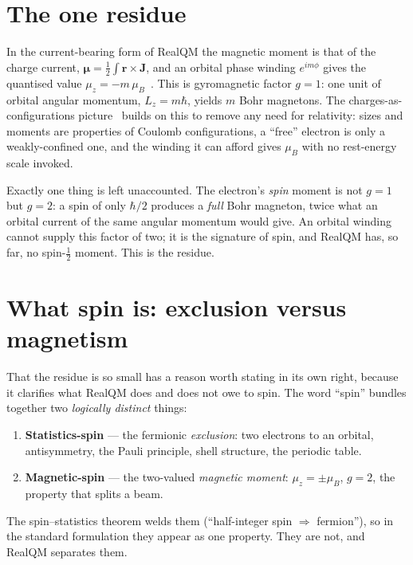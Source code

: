 \documentclass[11pt]{article}
\begin{document}

\section{The one residue}
\label{sec:residue}

In the current-bearing form of RealQM the magnetic moment is that of the charge current,
$\boldsymbol\mu=\tfrac12\int\mathbf r\times\mathbf J$, and an orbital phase winding $e^{im\phi}$ gives the
quantised value $\mu_z=-m\,\mu_B$~\cite{ComplexRealQM,NuclearMoment}. This is gyromagnetic factor
$g=1$: one unit of orbital angular momentum, $L_z=m\hbar$, yields $m$ Bohr magnetons. The
charges-as-configurations picture~\cite{Charges} builds on this to remove any need for relativity: sizes
and moments are properties of Coulomb configurations, a ``free'' electron is only a weakly-confined one,
and the winding it can afford gives $\mu_B$ with no rest-energy scale invoked.

Exactly one thing is left unaccounted. The electron's \emph{spin} moment is not $g=1$ but
\textbf{$g=2$}: a spin of only $\hbar/2$ produces a \emph{full} Bohr magneton, twice what an orbital
current of the same angular momentum would give. An orbital winding cannot supply this factor of two; it
is the signature of spin, and RealQM has, so far, no spin-$\tfrac12$ moment. This is the residue.

\section{What spin is: exclusion versus magnetism}
\label{sec:twoparts}

That the residue is so small has a reason worth stating in its own right, because it clarifies what RealQM
does and does not owe to spin. The word ``spin'' bundles together two \emph{logically distinct} things:
\begin{enumerate}
\item \textbf{Statistics-spin} --- the fermionic \emph{exclusion}: two electrons to an orbital,
antisymmetry, the Pauli principle, shell structure, the periodic table.
\item \textbf{Magnetic-spin} --- the two-valued \emph{magnetic moment}: $\mu_z=\pm\mu_B$, $g=2$, the
property that splits a beam.
\end{enumerate}
The spin--statistics theorem welds them (``half-integer spin $\Rightarrow$ fermion''), so in the standard
formulation they appear as one property. They are not, and RealQM separates them.
\end{document}
